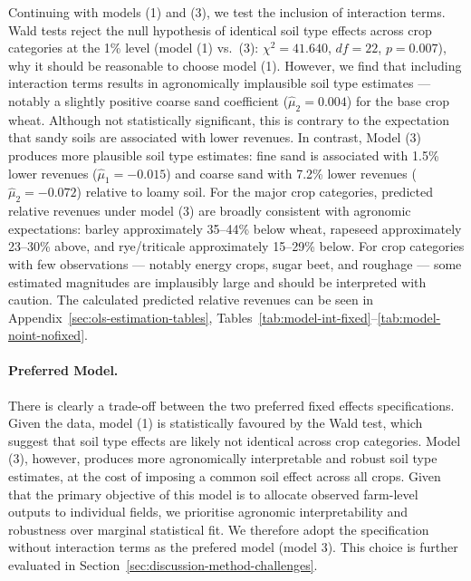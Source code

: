 \documentclass[12pt]{article}
\begin{document}
Continuing with models (1) and (3), we test the inclusion of interaction terms. 
Wald tests reject the null hypothesis of identical soil type effects across crop categories at the 1\% level (model (1) vs.\ (3): $\chi^2 = 41.640$, $df = 22$, $p = 0.007$), 
why it should be reasonable to choose model (1).
However, we find that including interaction terms results in agronomically implausible soil type estimates --- notably a slightly positive coarse sand coefficient ($\hat{\mu}_2 = 0.004$) for the base crop wheat.
Although not statistically significant, this is contrary to the expectation that sandy soils are associated with lower revenues.
In contrast, Model (3) produces more plausible soil type estimates: fine sand is associated with 1.5\% lower revenues ($\hat{\mu}_1 = -0.015$) and coarse sand with 7.2\% lower revenues ($\hat{\mu}_2 = -0.072$) relative to loamy soil.
For the major crop categories, predicted relative revenues under model (3) are broadly consistent with agronomic expectations: barley approximately 35--44\% below wheat, rapeseed approximately 23--30\% above, and rye/triticale approximately 15--29\% below.
For crop categories with few observations --- notably energy crops, sugar beet, and roughage --- some estimated magnitudes are implausibly large and should be interpreted with caution.
The calculated predicted relative revenues can be seen in Appendix~\ref{sec:ols-estimation-tables}, Tables~\ref{tab:model-int-fixed}--\ref{tab:model-noint-nofixed}.

\paragraph{Preferred Model.}
There is clearly a trade-off between the two preferred fixed effects specifications. 
Given the data, model (1) is statistically favoured by the Wald test, which suggest that soil type effects are likely not identical across crop categories. 
Model (3), however, produces more agronomically interpretable and robust soil type estimates, at the cost of imposing a common soil effect across all crops. 
Given that the primary objective of this model is to allocate observed farm-level outputs to individual fields, we prioritise agronomic interpretability and robustness over marginal statistical fit. 
We therefore adopt the specification without interaction terms as the prefered model (model 3). This choice is further evaluated in Section~\ref{sec:discussion-method-challenges}.
\end{document}
